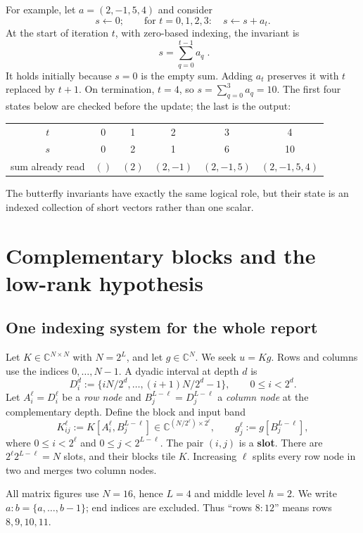 \documentclass[11pt]{article}
\newcommand{\C}{\mathbb{C}}
\begin{document}
For example, let $a=(2,-1,5,4)$ and consider
\[
 s\gets0;\qquad \text{for }t=0,1,2,3:\quad s\gets s+a_t .
\]
At the start of iteration $t$, with zero-based indexing, the invariant is
\[
 \boxed{\;s=\sum_{q=0}^{t-1}a_q\;}.
\]
It holds initially because $s=0$ is the empty sum.  Adding $a_t$ preserves it with $t$ replaced by $t+1$.  On termination, $t=4$, so $s=\sum_{q=0}^{3}a_q=10$.  The first four states below are checked before the update; the last is the output:
\begin{center}
\begin{tabular}{c|ccccc}
\toprule
$t$ & 0 & 1 & 2 & 3 & 4\\
$s$ & 0 & 2 & 1 & 6 & 10\\
sum already read & $()$ & $(2)$ & $(2,-1)$ & $(2,-1,5)$ & $(2,-1,5,4)$\\
\bottomrule
\end{tabular}
\end{center}
The butterfly invariants have exactly the same logical role, but their state is an indexed collection of short vectors rather than one scalar.

\section{Complementary blocks and the low-rank hypothesis}
\label{sec:blocks}

\subsection{One indexing system for the whole report}

Let $K\in\C^{N\times N}$ with $N=2^L$, and let $g\in\C^N$.  We seek $u=Kg$.  Rows and columns use the indices $0,\dots,N-1$.  A dyadic interval at depth $d$ is
\[
 D_i^d:=\{iN/2^d,\dots,(i+1)N/2^d-1\},\qquad 0\le i<2^d .
\]
Let $A_i^\ell=D_i^\ell$ be a \emph{row node} and $B_j^{L-\ell}=D_j^{L-\ell}$ a \emph{column node} at the complementary depth.  Define the block and input band
\[
 K_{ij}^{\ell}:=K[A_i^\ell,B_j^{L-\ell}]
 \in\C^{(N/2^\ell)\times 2^\ell},
 \qquad g_j^\ell:=g[B_j^{L-\ell}],
 \tag{1}\label{eq:block}
\]
where $0\le i<2^\ell$ and $0\le j<2^{L-\ell}$.  The pair $(i,j)$ is a \textbf{slot}.  There are $2^\ell2^{L-\ell}=N$ slots, and their blocks tile $K$.  Increasing $\ell$ splits every row node in two and merges two column nodes.

All matrix figures use $N=16$, hence $L=4$ and middle level $h=2$.  We write $a:b=\{a,\dots,b-1\}$; end indices are excluded.  Thus ``rows $8:12$'' means rows $8,9,10,11$.
\end{document}
